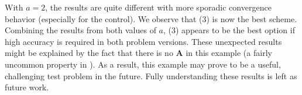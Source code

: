 With $a=2$, the results are quite different with more sporadic convergence behavior (especially for the control).
We observe that (3) is now the best scheme.
Combining the results from both values of $a$, (3) appears to be the best option if high accuracy is required in both problem versions.
These unexpected results might be explained by the fact that there is no $\bm{A}$ in this example (a fairly uncommon property in \lqdo).
As a result, this example may prove to be a useful, challenging test problem in the future.
Fully understanding these results is left as future work.